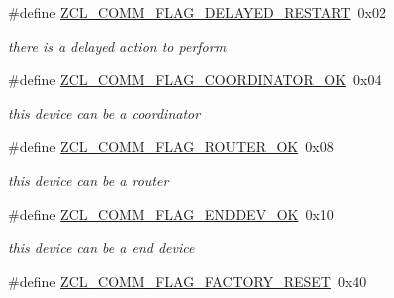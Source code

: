 \begin{DoxyCompactItemize}
\mbox{\label{group__zcl__commissioning_gaa56ed48c4587dd4c657a1e69f7e2fba7}} 
\#define \hyperlink{group__zcl__commissioning_gaa56ed48c4587dd4c657a1e69f7e2fba7}{Z\+C\+L\+\_\+\+C\+O\+M\+M\+\_\+\+F\+L\+A\+G\+\_\+\+D\+E\+L\+A\+Y\+E\+D\+\_\+\+R\+E\+S\+T\+A\+RT}~0x02
\begin{DoxyCompactList}\small\item\em there is a delayed action to perform \end{DoxyCompactList}\item 
\mbox{\label{group__zcl__commissioning_ga31a1726685fa4acfd6e27a00ba715e5d}} 
\#define \hyperlink{group__zcl__commissioning_ga31a1726685fa4acfd6e27a00ba715e5d}{Z\+C\+L\+\_\+\+C\+O\+M\+M\+\_\+\+F\+L\+A\+G\+\_\+\+C\+O\+O\+R\+D\+I\+N\+A\+T\+O\+R\+\_\+\+OK}~0x04
\begin{DoxyCompactList}\small\item\em this device can be a coordinator \end{DoxyCompactList}\item 
\mbox{\label{group__zcl__commissioning_ga3f21ae380281a600718338c090dd7176}} 
\#define \hyperlink{group__zcl__commissioning_ga3f21ae380281a600718338c090dd7176}{Z\+C\+L\+\_\+\+C\+O\+M\+M\+\_\+\+F\+L\+A\+G\+\_\+\+R\+O\+U\+T\+E\+R\+\_\+\+OK}~0x08
\begin{DoxyCompactList}\small\item\em this device can be a router \end{DoxyCompactList}\item 
\mbox{\label{group__zcl__commissioning_gaccf2d6e723514ff49e123264a3cbde5a}} 
\#define \hyperlink{group__zcl__commissioning_gaccf2d6e723514ff49e123264a3cbde5a}{Z\+C\+L\+\_\+\+C\+O\+M\+M\+\_\+\+F\+L\+A\+G\+\_\+\+E\+N\+D\+D\+E\+V\+\_\+\+OK}~0x10
\begin{DoxyCompactList}\small\item\em this device can be a end device \end{DoxyCompactList}\item 
\mbox{\label{group__zcl__commissioning_ga656e9fbebbb767dd47a59363944a0ee4}} 
\#define \hyperlink{group__zcl__commissioning_ga656e9fbebbb767dd47a59363944a0ee4}{Z\+C\+L\+\_\+\+C\+O\+M\+M\+\_\+\+F\+L\+A\+G\+\_\+\+F\+A\+C\+T\+O\+R\+Y\+\_\+\+R\+E\+S\+ET}~0x40

\end{DoxyCompactItemize}
